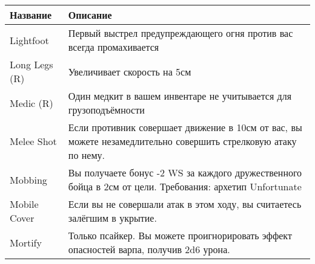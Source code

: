     \begin{table}[h]
        \begin{tabularx}{\textwidth}{|l|X|}
        \hline
        Название           & Описание                                                                                                                                                                                                                           \\ \hline
        Lightfoot          & Первый выстрел предупреждающего огня против вас всегда промахивается                                                                                                                                                               \\ \hline
        Long Legs (R)      & Увеличивает скорость на 5см                                                                                                                                                                                                        \\ \hline
        Medic (R)          & Один медкит в вашем инвентаре не учитывается для грузоподъёмности                                                                                                                                                                  \\ \hline
        Melee Shot         & Если противник совершает движение в 10см от вас, вы можете незамедлительно совершить стрелковую атаку по нему.                                                                                                                     \\ \hline
        Mobbing            & Вы получаете бонус -2 WS за каждого дружественного бойца в 2см от цели. Требования: архетип Unfortunate                                                                                                                            \\ \hline
        Mobile Cover       & Если вы не совершали атак в этом ходу, вы считаетесь залёгшим в укрытие.                                                                                                                                                           \\ \hline
        Mortify            & Только псайкер. Вы можете проигнорировать эффект опасностей варпа, получив 2d6 урона.                                                                                                                                              \\ \hline

\end{tabularx}
\end{table}
